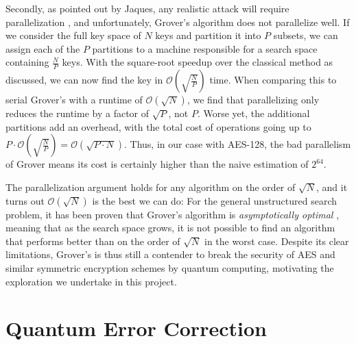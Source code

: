 Secondly, as pointed out by Jaques, any realistic attack will require parallelization \cite{jaques2024ches_presentation}, and unfortunately, Grover's algorithm does not parallelize well. If we consider the full key space of $N$ keys and partition it into $P$ subsets, we can assign each of the $P$ partitions to a machine responsible for a search space containing $\frac{N}{P}$ keys. With the square-root speedup over the classical method as discussed, we can now find the key in $\mathcal{O}(\sqrt{\frac{N}{P}})$ time. When comparing this to serial Grover's with a runtime of $\mathcal{O}(\sqrt{N})$, we find that parallelizing only reduces the runtime by a factor of $\sqrt{P}$, not $P$. Worse yet, the additional partitions add an overhead, with the total cost of operations going up to $P \cdot \mathcal{O}(\sqrt{\frac{N}{P}}) = \mathcal{O}(\sqrt{P \cdot N})$. Thus, in our case with AES-128, the bad parallelism of Grover means its cost is certainly higher than the naive estimation of $2^{64}$. 

The parallelization argument holds for any algorithm on the order of $\sqrt{N}$, and it turns out $\mathcal{O}(\sqrt{N})$ is the best we can do: For the general unstructured search problem, it has been proven that Grover's algorithm is \emph{asymptotically optimal} \cite{Bennett_1997, Zalka_1999}, meaning that as the search space grows, it is not possible to find an algorithm that performs better than on the order of $\sqrt{N}$ in the worst case. Despite its clear limitations, Grover's is thus still a contender to break the security of AES and similar symmetric encryption schemes by quantum computing, motivating the exploration we undertake in this project.

\chapter{Quantum Error Correction}\label{chap:QEC}

